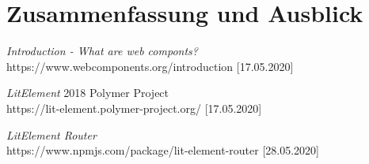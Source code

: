 \documentclass[12pt,					%
							 oneside,			%
							 a4paper,			%
							 halfparskip,		%
							 liststotoc,			%
							 bibtotoc,			%
							 fleqn,				%
							 pointlessnumbers]	%
							 {scrreprt}
\begin{document}
\chapter{Zusammenfassung und Ausblick}     


		
	
	
	\nocite{*}						%


\begin{thebibliography}{unsrt}
 \textit{Introduction - What are web componts?} \\
https://www.webcomponents.org/introduction [17.05.2020]

 \textit{LitElement} 2018 Polymer Project\\
https://lit-element.polymer-project.org/ [17.05.2020]

 \textit{LitElement Router}\\
https://www.npmjs.com/package/lit-element-router [28.05.2020]

\end{thebibliography}	

	\listoffigures						%

	\appendix
	
\end{document}
